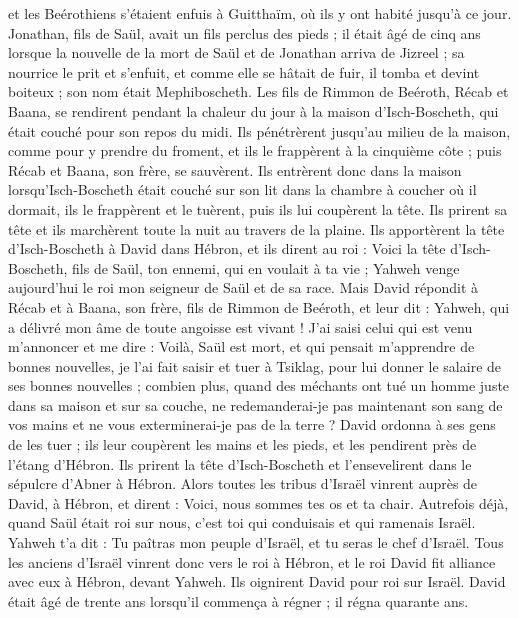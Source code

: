 \begin{multicols}{2}
et les Beérothiens s'étaient enfuis à Guitthaïm, où ils y ont habité jusqu'à ce jour.
Jonathan, fils de Saül, avait un fils perclus des pieds ; il était âgé de cinq ans lorsque la nouvelle de la mort de Saül et de Jonathan arriva de Jizreel ; sa nourrice le prit et s'enfuit, et comme elle se hâtait de fuir, il tomba et devint boiteux ; son nom était Mephiboscheth.
Les fils de Rimmon de Beéroth, Récab et Baana, se rendirent pendant la chaleur du jour à la maison d'Isch-Boscheth, qui était couché pour son repos du midi.
Ils pénétrèrent jusqu'au milieu de la maison, comme pour y prendre du froment, et ils le frappèrent à la cinquième côte ; puis Récab et Baana, son frère, se sauvèrent.
Ils entrèrent donc dans la maison lorsqu'Isch-Boscheth était couché sur son lit dans la chambre à coucher où il dormait, ils le frappèrent et le tuèrent, puis ils lui coupèrent la tête. Ils prirent sa tête et ils marchèrent toute la nuit au travers de la plaine.
Ils apportèrent la tête d'Isch-Boscheth à David dans Hébron, et ils dirent au roi : Voici la tête d'Isch-Boscheth, fils de Saül, ton ennemi, qui en voulait à ta vie ; Yahweh venge aujourd'hui le roi mon seigneur de Saül et de sa race.
Mais David répondit à Récab et à Baana, son frère, fils de Rimmon de Beéroth, et leur dit : Yahweh, qui a délivré mon âme de toute angoisse est vivant !
J'ai saisi celui qui est venu m'annoncer et me dire : Voilà, Saül est mort, et qui pensait m'apprendre de bonnes nouvelles, je l'ai fait saisir et tuer à Tsiklag, pour lui donner le salaire de ses bonnes nouvelles ;
combien plus, quand des méchants ont tué un homme juste dans sa maison et sur sa couche, ne redemanderai-je pas maintenant son sang de vos mains et ne vous exterminerai-je pas de la terre ?
David ordonna à ses gens de les tuer ; ils leur coupèrent les mains et les pieds, et les pendirent près de l'étang d'Hébron. Ils prirent la tête d'Isch-Boscheth et l'ensevelirent dans le sépulcre d'Abner à Hébron.
\VerseOne{}Alors toutes les tribus d'Israël vinrent auprès de David, à Hébron, et dirent : Voici, nous sommes tes os et ta chair.
Autrefois déjà, quand Saül était roi sur nous, c'est toi qui conduisais et qui ramenais Israël. Yahweh t'a dit : Tu paîtras mon peuple d'Israël, et tu seras le chef d'Israël.
Tous les anciens d'Israël vinrent donc vers le roi à Hébron, et le roi David fit alliance avec eux à Hébron, devant Yahweh. Ils oignirent David pour roi sur Israël.
David était âgé de trente ans lorsqu'il commença à régner ; il régna quarante ans.

\end{multicols}
